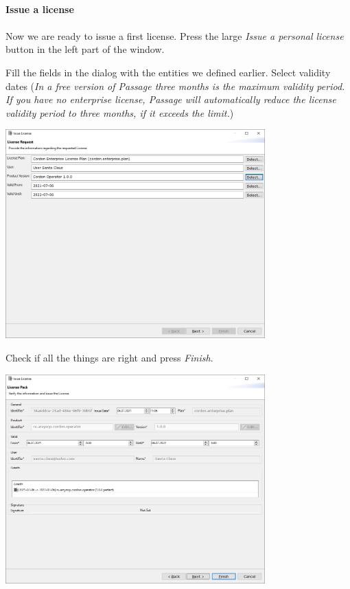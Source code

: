 \documentclass[12pt]{report}
\begin{document}
\paragraph*{Issue a license}
\paragraph*{}

Now we are ready to issue a first license. Press the large \textit{Issue a personal license} button in the left part of the window.

Fill the fields in the dialog with the entities we defined earlier. Select validity dates (\textit{In a free version of Passage three months is the maximum validity period.
 If you have no enterprise license, Passage will automatically reduce the license validity period to three months, if it exceeds the limit.})

\begin{center}
    \includegraphics[width=0.75\textwidth]{issue_first}
\end{center}

Check if all the things are right and press \textit{Finish}.

\begin{center}
    \includegraphics[width=0.75\textwidth]{issue_second}
\end{center}
\end{document}
